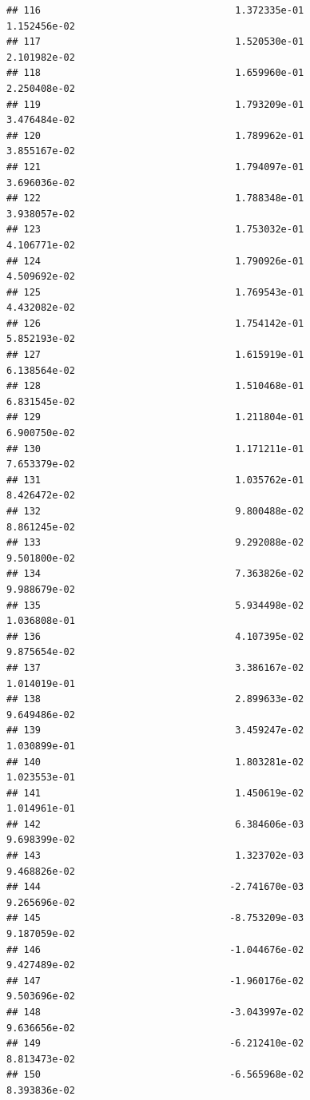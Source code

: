 \documentclass[
]{article}
\begin{document}
\begin{verbatim}
## 116                                  1.372335e-01           1.152456e-02
## 117                                  1.520530e-01           2.101982e-02
## 118                                  1.659960e-01           2.250408e-02
## 119                                  1.793209e-01           3.476484e-02
## 120                                  1.789962e-01           3.855167e-02
## 121                                  1.794097e-01           3.696036e-02
## 122                                  1.788348e-01           3.938057e-02
## 123                                  1.753032e-01           4.106771e-02
## 124                                  1.790926e-01           4.509692e-02
## 125                                  1.769543e-01           4.432082e-02
## 126                                  1.754142e-01           5.852193e-02
## 127                                  1.615919e-01           6.138564e-02
## 128                                  1.510468e-01           6.831545e-02
## 129                                  1.211804e-01           6.900750e-02
## 130                                  1.171211e-01           7.653379e-02
## 131                                  1.035762e-01           8.426472e-02
## 132                                  9.800488e-02           8.861245e-02
## 133                                  9.292088e-02           9.501800e-02
## 134                                  7.363826e-02           9.988679e-02
## 135                                  5.934498e-02           1.036808e-01
## 136                                  4.107395e-02           9.875654e-02
## 137                                  3.386167e-02           1.014019e-01
## 138                                  2.899633e-02           9.649486e-02
## 139                                  3.459247e-02           1.030899e-01
## 140                                  1.803281e-02           1.023553e-01
## 141                                  1.450619e-02           1.014961e-01
## 142                                  6.384606e-03           9.698399e-02
## 143                                  1.323702e-03           9.468826e-02
## 144                                 -2.741670e-03           9.265696e-02
## 145                                 -8.753209e-03           9.187059e-02
## 146                                 -1.044676e-02           9.427489e-02
## 147                                 -1.960176e-02           9.503696e-02
## 148                                 -3.043997e-02           9.636656e-02
## 149                                 -6.212410e-02           8.813473e-02
## 150                                 -6.565968e-02           8.393836e-02

\end{verbatim}
\end{document}
